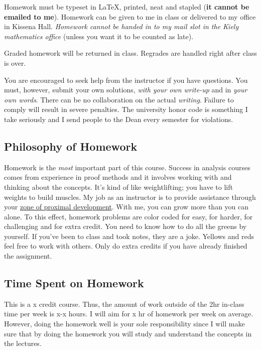 \documentclass[12pt]{article}
\begin{document}
Homework must be typeset in \LaTeX, printed, neat and stapled (\textbf{it cannot be emailed to me}). Homework can be given to me in class or delivered to my office in Kissena Hall. \textit{Homework cannot be handed in to my mail slot in the Kiely mathematics office} (unless you want it to be counted as late).

Graded homework will be returned in class. Regrades are handled right after class is over.

You are encouraged to seek help from the instructor if you have questions.  You must, however, submit your own solutions, \textit{with your own write-up} and in \textit{your own words}. There can be no collaboration on the actual \textit{writing}. Failure to comply will result in severe penalties. The university honor code is something I take seriously and I send people to the Dean every semester for violations.

\subsection*{Philosophy of Homework}


Homework is the \textit{most} important part of this course. Success in analysis courses comes from experience in proof methods and it involves working with and thinking about the concepts. It's kind of like weightlifting; you have to lift weights to build muscles. My job as an instructor is to provide assistance through your \href{http://en.wikipedia.org/wiki/Zone_of_proximal_development}{zone of proximal development}. With me, you can grow more than you can alone. To this effect, homework problems are color coded  for easy,  for harder,  for challenging and  for extra credit. You need to know how to do all the greens by yourself. If you've been to class and took notes, they are a joke. Yellows and reds feel free to work with others. Only do extra credits if you have already finished the assignment.

\subsection*{Time Spent on Homework }

This is a x credit course. Thus, the amount of work outside of the 2hr in-class time per week is x-x hours. I will aim for x hr of homework per week on average. However, doing the homework well is your sole responsibility since I will make sure that by doing the homework you will study and understand the concepts in the lectures.
\end{document}
